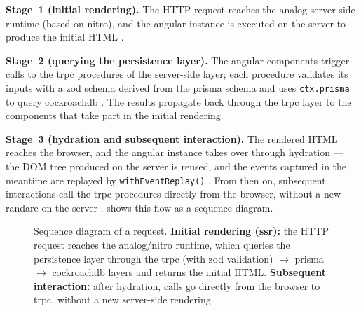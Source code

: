\textbf{Stage~1 (initial rendering).} The HTTP request reaches the \gls{analog} server-side runtime (based on \gls{nitro}), and the \gls{angular} instance is executed on the server to produce the initial HTML \cite{analog,nitro}.

\textbf{Stage~2 (querying the persistence layer).} The \gls{angular} components trigger calls to the \gls{trpc} procedures of the server-side layer; each procedure validates its inputs with a \gls{zod} schema derived from the \gls{prisma} schema and uses \texttt{ctx.prisma} to query \gls{cockroachdb} \cite{trpc,zod,prisma_zod_generator,prisma_cockroachdb}. The results propagate back through the \gls{trpc} layer to the components that take part in the initial rendering.

\textbf{Stage~3 (hydration and subsequent interaction).} The rendered HTML reaches the browser, and the \gls{angular} instance takes over through \gls{hydration} --- the DOM tree produced on the server is reused, and the events captured in the meantime are replayed by \texttt{withEventReplay()} \cite{analog}. From then on, subsequent interactions call the \gls{trpc} procedures directly from the browser, without a new \gls{randare} on the server \cite{trpc}.  shows this flow as a sequence diagram.

\begin{figure}[htbp]
  \centering
  \caption[Sequence diagram of a request]{Sequence diagram of a
    request. \textbf{Initial rendering (\acrshort{ssr}):} the HTTP request reaches
    the \gls{analog}/\gls{nitro} runtime, which queries the persistence layer
    through the \gls{trpc} (with \gls{zod} validation) \(\rightarrow\) \gls{prisma}
    \(\rightarrow\) \gls{cockroachdb} layers and returns the initial HTML.
    \textbf{Subsequent interaction:} after hydration, calls go directly
    from the browser to \gls{trpc}, without a new server-side rendering.}
  \label{fig:flux-executie}
\end{figure}

